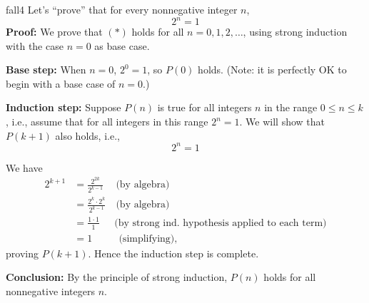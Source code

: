 

\begin{example}{fall4} Let's ``prove'' that for every nonnegative integer $n$, 
\[
\tag{$P(n)$} 2^n=1
\]
\textbf{Proof:} We prove that $(*)$ holds for all $n=0,1,2,\dots$, using
strong induction with the case $n=0$ as base case.

\textbf{Base step:} When $n=0$, $2^0=1$, so $P(0)$ holds. (Note: it is perfectly OK to begin with a base case of $n=0$.)

\textbf{Induction step:} 
Suppose $P(n)$ is true for all integers $n$ in the range $0\le n\le k$, i.e.,
assume that for all integers in this range $2^n=1$.
We will show that $P(k+1)$ also holds, i.e., 
\[
\tag{$P(k+1)$} 2^n=1
\]

We have
\begin{align*}
2^{k+1}&=\frac{2^{2k}}{2^{k-1}}
\quad~\text{(by algebra)}
\\
&=\frac{2^k\cdot 2^k}{2^{k-1}}
\quad\text{(by algebra)}
\\
&=\frac{1\cdot 1}{1}
\quad~~\text{(by strong ind. hypothesis applied to each term)}
\\
&=1
\qquad~~~\text{(simplifying),}
\end{align*}
proving $P(k+1)$. Hence the induction step is complete.

\textbf{Conclusion:} By the principle of strong induction, $P(n)$ holds for all
nonnegative integers $n$.
\end{example}


